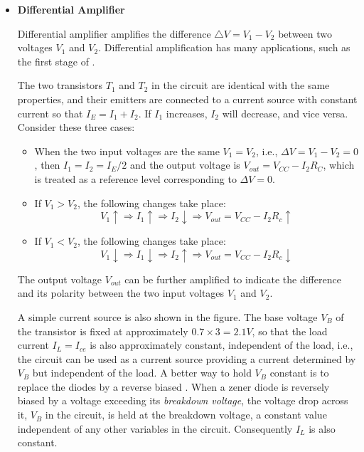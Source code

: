 \documentclass{article}
\begin{document}
\begin{itemize}

\item {\bf Differential Amplifier}

Differential amplifier amplifies the difference $\triangle V=V_1-V_2$ 
between two voltages $V_1$ and $V_2$. Differential amplification has 
many applications, such as the first stage of 
.

The two transistors $T_1$ and $T_2$ in the circuit are identical with
the same properties, and their emitters are connected to a current source
with constant current so that $I_E=I_1+I_2$. If $I_1$ increases, $I_2$
will decrease, and vice versa. Consider these three cases:
\begin{itemize}
\item When the two input voltages are the same $V_1=V_2$, i.e., $\Delta V=V_1-V_2=0$,
  then $I_1=I_2=I_E/2$ and the output voltage is $V_{out}=V_{CC}-I_2 R_C$, which
  is treated as a reference level corresponding to $\Delta V=0$.
\item If $V_1>V_2$, the following changes take place:
  \begin{equation} 
    V_1 \uparrow \Longrightarrow I_1 \uparrow \Longrightarrow I_2 
    \downarrow \Longrightarrow V_{out}=V_{CC}-I_2 R_c \uparrow 
  \end{equation}
\item If $V_1<V_2$, the following changes take place:
  \begin{equation} 
    V_1 \downarrow \Longrightarrow I_1 \downarrow \Longrightarrow I_2 
    \uparrow \Longrightarrow V_{out}=V_{CC}-I_2 R_c \downarrow 
  \end{equation}
\end{itemize}
The output voltage $V_{out}$ can be further amplified to indicate the 
difference and its polarity between the two input voltages $V_1$ and 
$V_2$.

A simple current source is also shown in the figure. The base voltage 
$V_B$ of the transistor is fixed at approximately $0.7\times 3=2.1V$, 
so that the load current $I_L=I_{ce}$ is also approximately constant, 
independent of the load, i.e., the circuit can be used as a current source 
providing a current determined by $V_B$ but independent of the load. A 
better way to hold $V_B$ constant is to replace the diodes by a reverse biased
.
When a zener diode is reversely biased by a voltage exceeding its
{\em breakdown voltage}, the voltage drop across it, $V_B$ in the circuit,
is held at the breakdown voltage, a constant value independent of any
other variables in the circuit. Consequently $I_L$ is also constant.



\end{itemize}
\end{document}
